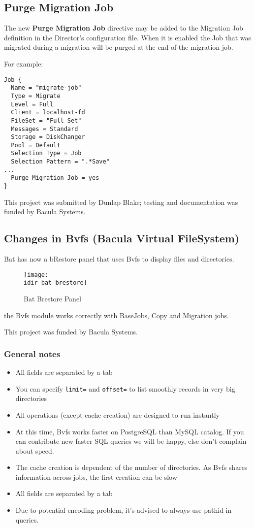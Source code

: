 \subsection{Purge Migration Job}

The new {\bf Purge Migration Job} directive may be added to the Migration
Job definition in the Director's configuration file. When it is enabled 
the Job that was migrated during a migration will be purged at
the end of the migration job.

For example:
\begin{verbatim}
Job {
  Name = "migrate-job"
  Type = Migrate
  Level = Full
  Client = localhost-fd
  FileSet = "Full Set"
  Messages = Standard
  Storage = DiskChanger
  Pool = Default
  Selection Type = Job
  Selection Pattern = ".*Save"
...
  Purge Migration Job = yes
}
\end{verbatim}

\medskip

This project was submitted by Dunlap Blake; testing and documentation was funded
by Bacula Systems.

\subsection{Changes in Bvfs (Bacula Virtual FileSystem)}

Bat has now a bRestore panel that uses Bvfs to display files and
directories.

\begin{figure}[htbp]
  \centering
  \texttt{[image: \\idir bat-brestore]}
  \label{fig:batbrestore}
  \caption{Bat Brestore Panel}
\end{figure}

the Bvfs module works correctly with BaseJobs, Copy and Migration jobs.

\medskip
This project was funded by Bacula Systems.

\subsubsection*{General notes}

\begin{itemize}
\item All fields are separated by a tab
\item You can specify \texttt{limit=} and \texttt{offset=} to list smoothly
  records in very big directories
\item All operations (except cache creation) are designed to run instantly
\item At this time, Bvfs works faster on PostgreSQL than MySQL catalog. If you
  can contribute new faster SQL queries we will be happy, else don't complain
  about speed.
\item The cache creation is dependent of the number of directories. As Bvfs
  shares information across jobs, the first creation can be slow
\item All fields are separated by a tab
\item Due to potential encoding problem, it's advised to always use pathid in
  queries.
\end{itemize}


